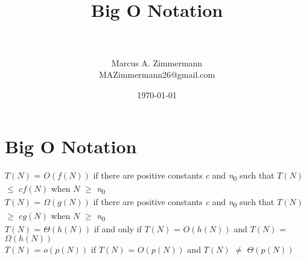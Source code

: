 \documentclass[letterpaper, 10pt,DIV=13]{scrartcl}
\title{	
   \normalfont \normalsize
   \horrule{0.5pt} \\[0.25cm] 	%
   \huge Big O Notation  \\     	    %
   \horrule{0.5pt} \\[0.25cm] 	%
}
\author{Marcus A. Zimmermann \\ \normalsize MAZimmermann26@gmail.com}
\date{\normalsize\today} 	%
\numberwithin{equation}{section} %
\numberwithin{figure}{section} %
\numberwithin{table}{section} %
\begin{document}
\maketitle %

\section*{Big O Notation}

$T(N)$ =  $O(f(N))$ if there are positive constants \textit{c} and \textit{n}\textsubscript{0} such 
that $T(N)$ $\leq$ $cf(N)$ when $N$ $\geq$ \textit{n}\textsubscript{0} \\

$T(N)$ =  $\Omega(g(N))$ if there are positive constants \textit{c} and \textit{n}\textsubscript{0} such 
that $T(N)$ $\geq$ $cg(N)$ when $N$ $\geq$ \textit{n}\textsubscript{0} \\

$T(N)$ =  $\Theta(h(N))$ if and only if $T(N)$ =  $O(h(N))$ and $T(N)$ =  $\Omega(h(N))$ \\

$T(N)$ =  $o(p(N))$ if $T(N)$ =  $O(p(N))$ and $T(N)$  $\neq$  $\Theta(p(N))$

\end{document}
